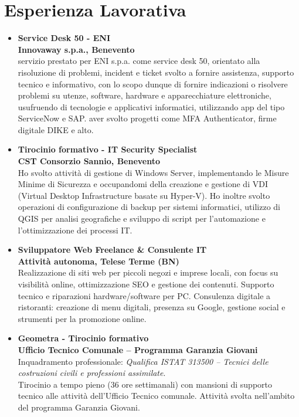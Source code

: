 \documentclass[a4paper,10pt]{article}
\begin{document}
\section*{\faBriefcase \quad Esperienza Lavorativa}
\begin{itemize}[leftmargin=*]
  \item \textbf{\textcolor{mainblue}{Service Desk 50 - ENI}}\\
  \textbf {Innovaway s.p.a., Benevento \quad {[17/02/2022 - 31/07/2025]}}\\
  servizio prestato per ENI s.p.a. come service desk 50, orientato alla risoluzione di problemi, incident e ticket svolto a fornire assistenza, supporto tecnico e informativo, con lo scopo dunque di fornire indicazioni o risolvere problemi su utenze, software, hardware e apparecchiature elettroniche, usufruendo di tecnologie e applicativi informatici, utilizzando app del tipo ServiceNow e SAP. aver svolto progetti come MFA Authenticator, firme digitale DIKE e alto.
  
  \item \textbf{\textcolor{mainblue}{Tirocinio formativo - IT Security Specialist}}\\
  \textbf {CST Consorzio Sannio, Benevento \quad {[12/09/2019 – 26/11/2019]}}\\
  Ho svolto attività di gestione di Windows Server, implementando le Misure Minime di Sicurezza e occupandomi della creazione e gestione di VDI (Virtual Desktop Infrastructure basate su Hyper-V). Ho inoltre svolto operazioni di configurazione di backup per sistemi informatici, utilizzo di QGIS per analisi geografiche e sviluppo di script per l'automazione e l'ottimizzazione dei processi IT.

  \item \textbf{\textcolor{mainblue}{Sviluppatore Web Freelance \& Consulente IT}}\\
  \textbf {Attività autonoma, Telese Terme (BN) \quad {[2016 – Presente]}}\\
  Realizzazione di siti web per piccoli negozi e imprese locali, con focus su visibilità online, ottimizzazione SEO e gestione dei contenuti.
  Supporto tecnico e riparazioni hardware/software per PC.
  Consulenza digitale a ristoranti: creazione di menu digitali, presenza su Google, gestione social e strumenti per la promozione online.

  \item \textbf{\textcolor{mainblue}{Geometra - Tirocinio formativo}}\\
  \textbf {Ufficio Tecnico Comunale – Programma Garanzia Giovani \quad {[18/06/2015 - 17/12/2015]}}\\
  Inquadramento professionale: \textit{Qualifica ISTAT 313500 – Tecnici delle costruzioni civili e professioni assimilate}.\\
  Tirocinio a tempo pieno (36 ore settimanali) con mansioni di supporto tecnico alle attività dell’Ufficio Tecnico comunale. Attività svolta nell’ambito del programma Garanzia Giovani.


\end{itemize}
\end{document}
